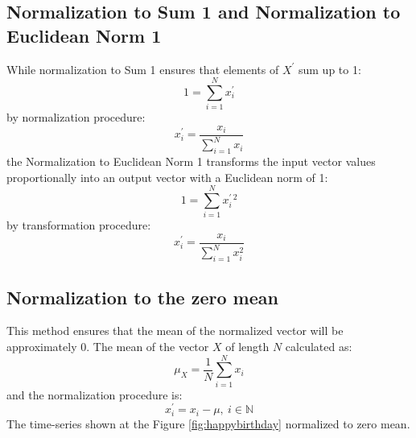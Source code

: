 \subsection{Normalization to Sum 1 and Normalization to Euclidean Norm 1}
While normalization to Sum 1 ensures that elements of $X^{'}$ sum up to 1:
\begin{equation}
1 = \sum_{i=1}^{N} x_{i}^{'}
\end{equation}
by normalization procedure:
\begin{equation}
x_{i}^{'} = \frac{ x_{i} }{ \sum_{i=1}^{N} x_{i} }
\end{equation}
the Normalization to Euclidean Norm 1 transforms the input vector values proportionally into an output vector with a Euclidean norm of 1:
\begin{equation}
1 = \sum_{i=1}^{N} x_{i}^{' \: 2}
\end{equation}
by transformation procedure:
\begin{equation}
x_{i}^{'} = \frac{ x_{i} }{ \sum_{i=1}^{N} x_{i}^2 }
\end{equation}

\subsection{Normalization to the zero mean}
This method ensures that the mean of the normalized vector will be approximately $0$. The mean of the vector $X$ of length $N$ calculated as:
\begin{equation}
\mu_{X} = \frac{1}{N}\sum_{i=1}^{N}x_{i}
\end{equation}
and the normalization procedure is:
\begin{equation}
x_{i}^{'} = x_{i} - \mu, \: i \in \mathbb{N}
\end{equation}
The time-series shown at the Figure \ref{fig:happybirthday} normalized to zero mean.

